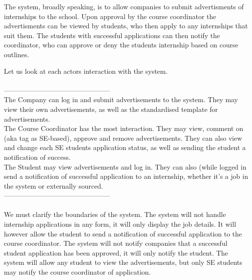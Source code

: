 \documentclass{l3deliverable}
\begin{document}


The system, broadly speaking, is to allow companies to submit advertisments 
of internships to the school. Upon approval by the course coordinator the 
advertisments can be viewed by students, who then apply to any internships 
that suit them. The students with successful applications can then notify 
the coordinator, who can approve or deny the students internship based on 
course outlines. 

Let us look at each actors interaction with the system.\\
\\
-----------------------------------------------\\
The Company can log in and submit advertisements to the system. They may 
view their own advertisements, as well as the standardised template for 
advertisements.\\

The Course Coordinator has the most interaction. They may view, comment 
on (aka tag as SE-based), approve and remove advertisements. They can also 
view and change each SE students application status, as well as sending 
the student a notification of success.\\

The Student may view advertisements and log in. They can also (while logged 
in send a notification of successful application to an internship, whether 
it's a job in the system or externally sourced.\\
-----------------------------------------------\\
\\
We must clarify the boundaries of the system. The system will not 
handle internship applications in any form, it will only display the 
job details. It will however allow the student to send a notification 
of successful application to the course coordinator. The system will 
not notify companies that a successful student application has been 
approved, it will only notify the student. The system will allow any 
student to view the advertisements, but only SE students may notify 
the course coordinator of application.

\end{document}
